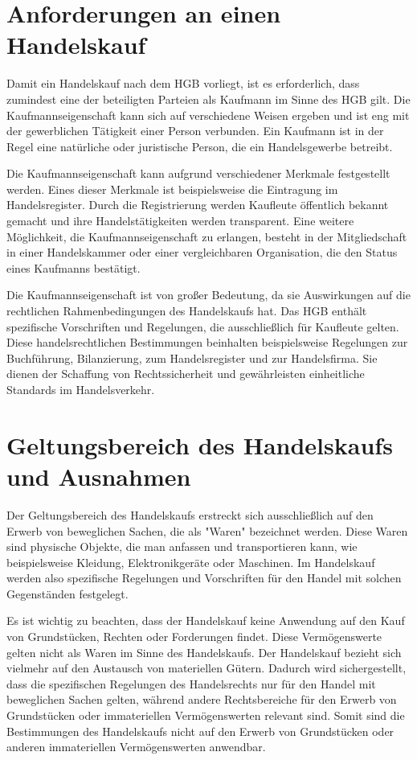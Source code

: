 \section{Anforderungen an einen Handelskauf}
Damit ein Handelskauf nach dem \ac{HGB} vorliegt, ist es erforderlich, dass zumindest eine der beteiligten Parteien als Kaufmann im Sinne des HGB gilt. Die Kaufmannseigenschaft kann sich auf verschiedene Weisen ergeben und ist eng mit der gewerblichen Tätigkeit einer Person verbunden. Ein Kaufmann ist in der Regel eine natürliche oder juristische Person, die ein Handelsgewerbe betreibt.

Die Kaufmannseigenschaft kann aufgrund verschiedener Merkmale festgestellt werden. Eines dieser Merkmale ist beispielsweise die Eintragung im Handelsregister. Durch die Registrierung werden Kaufleute öffentlich bekannt gemacht und ihre Handelstätigkeiten werden transparent. Eine weitere Möglichkeit, die Kaufmannseigenschaft zu erlangen, besteht in der Mitgliedschaft in einer Handelskammer oder einer vergleichbaren Organisation, die den Status eines Kaufmanns bestätigt.

Die Kaufmannseigenschaft ist von großer Bedeutung, da sie Auswirkungen auf die rechtlichen Rahmenbedingungen des Handelskaufs hat. Das \ac{HGB} enthält spezifische Vorschriften und Regelungen, die ausschließlich für Kaufleute gelten. Diese handelsrechtlichen Bestimmungen beinhalten beispielsweise Regelungen zur Buchführung, Bilanzierung, zum Handelsregister und zur Handelsfirma. Sie dienen der Schaffung von Rechtssicherheit und gewährleisten einheitliche Standards im Handelsverkehr.
\newpage\section{Geltungsbereich des Handelskaufs und Ausnahmen}
Der Geltungsbereich des Handelskaufs erstreckt sich ausschließlich auf den Erwerb von beweglichen Sachen, die als "Waren" bezeichnet werden. Diese Waren sind physische Objekte, die man anfassen und transportieren kann, wie beispielsweise Kleidung, Elektronikgeräte oder Maschinen. Im Handelskauf werden also spezifische Regelungen und Vorschriften für den Handel mit solchen Gegenständen festgelegt.

Es ist wichtig zu beachten, dass der Handelskauf keine Anwendung auf den Kauf von Grundstücken, Rechten oder Forderungen findet. Diese Vermögenswerte gelten nicht als Waren im Sinne des Handelskaufs. Der Handelskauf bezieht sich vielmehr auf den Austausch von materiellen Gütern. Dadurch wird sichergestellt, dass die spezifischen Regelungen des Handelsrechts nur für den Handel mit beweglichen Sachen gelten, während andere Rechtsbereiche für den Erwerb von Grundstücken oder immateriellen Vermögenswerten relevant sind. Somit sind die Bestimmungen des Handelskaufs nicht auf den Erwerb von Grundstücken oder anderen immateriellen Vermögenswerten anwendbar.
